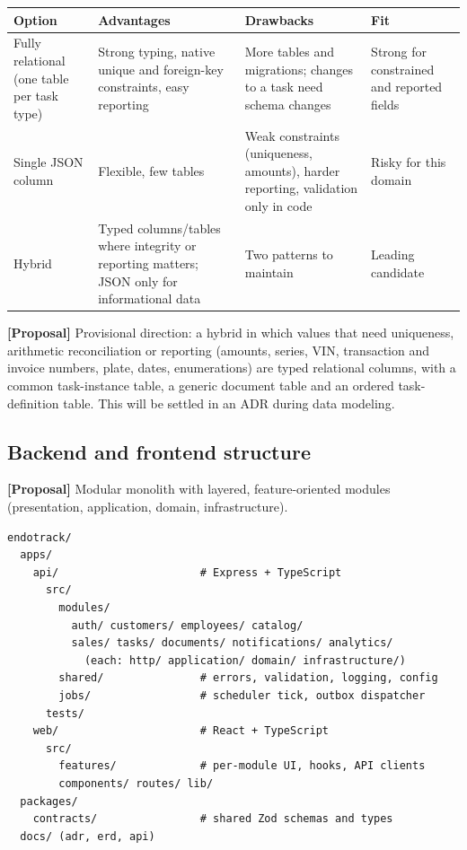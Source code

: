 \documentclass[11pt,a4paper]{article}
\newcommand{\tagprop}{\textcolor{orange!80!black}{\textbf{[Proposal]}}}
\begin{document}
\begin{longtable}{@{}L{3.0cm}L{4.1cm}L{4.1cm}L{4.6cm}@{}}
	\toprule
	\textbf{Option}                                                   &
	\textbf{Advantages}
	                                                                  &
	\textbf{Drawbacks}
	                                                                  &
	\textbf{Fit}
	\\
	\midrule
	\endhead
	Fully relational (one table per task type)                        & Strong
	typing, native unique and foreign-key constraints, easy reporting & More
	tables
	and migrations; changes to a task need schema changes             & Strong for
	constrained
	and reported fields
	\\
	Single JSON column                                                & Flexible,
	few tables
	                                                                  & Weak
	constraints (uniqueness, amounts), harder reporting, validation only in
	code                                                              & Risky for
	this domain
	\\
	Hybrid                                                            & Typed
	columns/tables where
	integrity or reporting matters; JSON only for informational data  & Two
	patterns
	to maintain                                                       & Leading
	candidate
	\\
	\bottomrule
\end{longtable}

\tagprop{} Provisional direction: a hybrid in which values that need uniqueness,
arithmetic reconciliation or reporting (amounts, series, VIN, transaction and
invoice numbers, plate, dates, enumerations) are typed relational columns, with
a common task-instance table, a generic document table and an ordered
task-definition table. This will be settled in an ADR during data modeling.

\subsection{Backend and frontend structure}

\tagprop{} Modular monolith with layered, feature-oriented modules
(presentation, application, domain, infrastructure).

\begin{verbatim}
endotrack/
  apps/
    api/                      # Express + TypeScript
      src/
        modules/
          auth/ customers/ employees/ catalog/
          sales/ tasks/ documents/ notifications/ analytics/
            (each: http/ application/ domain/ infrastructure/)
        shared/               # errors, validation, logging, config
        jobs/                 # scheduler tick, outbox dispatcher
      tests/
    web/                      # React + TypeScript
      src/
        features/             # per-module UI, hooks, API clients
        components/ routes/ lib/
  packages/
    contracts/                # shared Zod schemas and types
  docs/ (adr, erd, api)
\end{verbatim}
\end{document}

